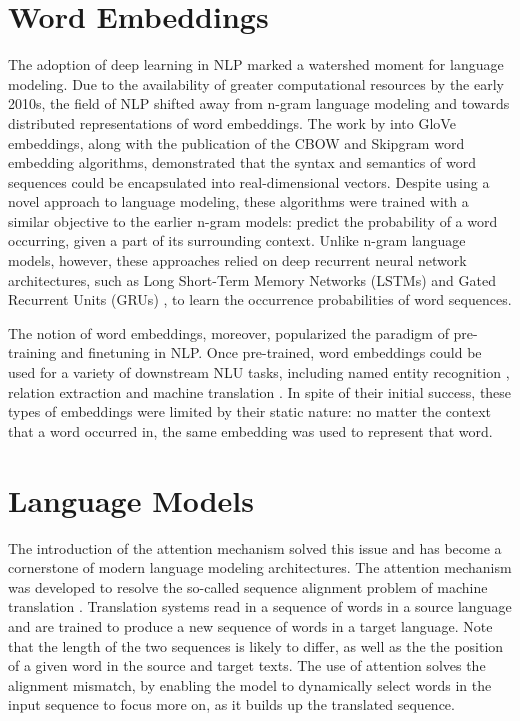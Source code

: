 

\section{Word Embeddings}

The adoption of deep learning in NLP marked a watershed moment for language modeling. Due to the availability of greater computational resources by the early 2010s, the field of NLP shifted away from n-gram language modeling and towards distributed representations of word embeddings. The work by \cite{pennington2014glove} into GloVe embeddings, along with the publication of the CBOW \citep{mikolov2013efficient} and Skipgram \citep{mikolov2013distributed, mikolov2013efficient} word embedding algorithms, demonstrated that the syntax and semantics of word sequences could be encapsulated into real-dimensional vectors. Despite using a novel approach to language modeling, these algorithms were trained with a similar objective to the earlier n-gram models: predict the probability of a word occurring, given a part of its surrounding context. Unlike n-gram language models, however, these approaches relied on deep recurrent neural network architectures, such as Long Short-Term Memory Networks (LSTMs) \citep{hochreiter1997long} and Gated Recurrent Units (GRUs) \citep{cho2014properties}, to learn the occurrence probabilities of word sequences. 

The notion of word embeddings, moreover, popularized the paradigm of pre-training and finetuning in NLP. Once pre-trained, word embeddings could be used for a variety of downstream NLU tasks, including named entity recognition \citep{lample2016neural}, relation extraction \citep{nguyen2015relation} and machine translation \citep{qi-etal-2018-pre}. In spite of their initial success, these types of embeddings were limited by their static nature: no matter the context that a word occurred in, the same embedding was used to represent that word. 


\section{Language Models}

The introduction of the attention mechanism solved this issue and has become a cornerstone of modern language modeling architectures. The attention mechanism was developed to resolve the so-called sequence alignment problem of machine translation \citep{bahdanau2014neural,luong2015effective}. Translation systems read in a sequence of words in a source language and are trained to produce a new sequence of words in a target language. Note that the length of the two sequences is likely to differ, as well as the the position of a given word in the source and target texts. The use of attention solves the alignment mismatch, by enabling the model to dynamically select words in the input sequence to focus more on, as it builds up the translated sequence. 


